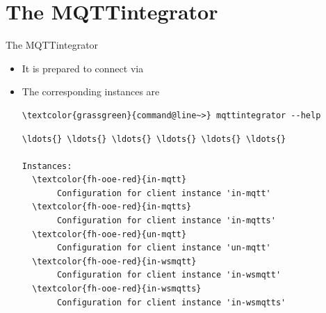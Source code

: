 ﻿\section[withsectionpage]{The MQTTintegrator}

\begin{frame}[fragile]{The MQTTintegrator}
\begin{itemize}
\item It is prepared to connect via
\item The corresponding instances are
\begin{scriptsize}
\begin{Verbatim}[commandchars=\\\{\}]
\textcolor{grassgreen}{command@line~>} mqttintegrator --help
\end{Verbatim}
\begin{Verbatim}[commandchars=\\\{\},frame=leftline,rulecolor=\color{fh-ooe-red}]
\ldots{} \ldots{} \ldots{} \ldots{} \ldots{} \ldots{}

Instances:
  \textcolor{fh-ooe-red}{in-mqtt}
       Configuration for client instance 'in-mqtt'
  \textcolor{fh-ooe-red}{in-mqtts}
       Configuration for client instance 'in-mqtts'
  \textcolor{fh-ooe-red}{un-mqtt}
       Configuration for client instance 'un-mqtt'
  \textcolor{fh-ooe-red}{in-wsmqtt}
       Configuration for client instance 'in-wsmqtt'
  \textcolor{fh-ooe-red}{in-wsmqtts}
       Configuration for client instance 'in-wsmqtts'
\end{Verbatim}
\end{scriptsize}
\end{itemize}
\end{frame}

